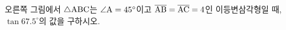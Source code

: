 \noindent\begin{minipage}[t]{0.58\linewidth}\vspace{0pt}\raggedright 오른쪽 그림에서 $\triangle\mathrm{ABC}$는 $\angle\mathrm{A}=45^\circ$이고 $\overline{\mathrm{AB}}=\overline{\mathrm{AC}}=4$인 이등변삼각형일 때, $\tan 67.5^\circ$의 값을 구하시오.\end{minipage}\hfill\begin{minipage}[t]{0.4\linewidth}\vspace{0pt}\centering \resizebox{\ifdim\width>\linewidth\linewidth\else\width\fi}{!}{}\end{minipage}\par
